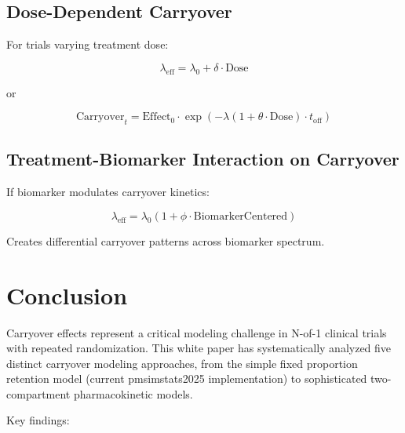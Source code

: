 \documentclass[11pt,a4paper]{article}
\begin{document}
\subsection{Dose-Dependent Carryover}

For trials varying treatment dose:

\begin{equation}
  \lambda_{\text{eff}} = \lambda_0 + \delta \cdot \text{Dose}
\end{equation}

or

\begin{equation}
  \text{Carryover}_t = \text{Effect}_0 \cdot \exp(-\lambda(1 + \theta \cdot \text{Dose}) \cdot t_{\text{off}})
\end{equation}

\subsection{Treatment-Biomarker Interaction on Carryover}

If biomarker modulates carryover kinetics:

\begin{equation}
  \lambda_{\text{eff}} = \lambda_0(1 + \phi \cdot \text{BiomarkerCentered})
\end{equation}

Creates differential carryover patterns across biomarker spectrum.

\section{Conclusion}
\label{sec:conclusion}

Carryover effects represent a critical modeling challenge in N-of-1 clinical trials with repeated randomization. This white paper has systematically analyzed five distinct carryover modeling approaches, from the simple fixed proportion retention model (current pmsimstats2025 implementation) to sophisticated two-compartment pharmacokinetic models.

Key findings:
\end{document}
